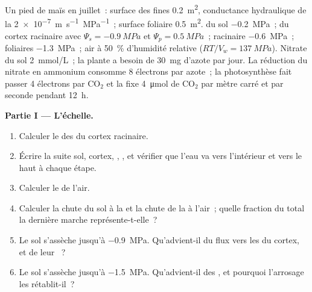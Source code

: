 \begin{problem}
\label{pb:b1:plant-water-minerals:1}
Un pied de maïs en juillet~: surface des  fines \qty{0.2}{m^2},
conductance hydraulique de la 
\qty{2e-7}{m.s^{-1}.MPa^{-1}}~; surface foliaire \qty{0.5}{m^2}.
 du sol \qty{-0.2}{MPa}~;  du cortex racinaire
avec $\Psi_s = \qty{-0.9}{MPa}$ et $\Psi_p = \qty{0.5}{MPa}$~; 
racinaire \qty{-0.6}{MPa}~;  foliaires \qty{-1.3}{MPa}~; air à
\qty{50}{\%} d'humidité relative ($RT/V_w = \qty{137}{MPa}$). Nitrate du
sol \qty{2}{mmol/L}~; la plante a besoin de \qty{30}{mg} d'azote par
jour. La réduction du nitrate en ammonium consomme 8 électrons par
azote~; la photosynthèse fait passer 4 électrons par $\mathrm{CO_2}$ et
la  fixe \qty{4}{\micro mol} de $\mathrm{CO_2}$ par mètre carré
et par seconde pendant \qty{12}{h}.

\medskip
\noindent\textbf{Partie I --- L'échelle.}
\begin{enumerate}
  \item Calculer le  des  du cortex racinaire.
  \item Écrire la suite sol, cortex, , , et vérifier que
        l'eau va vers l'intérieur et vers le haut à chaque étape.
  \item Calculer le  de l'air.
  \item Calculer la chute du sol à la  et la chute de la 
        à l'air~; quelle fraction du total la dernière marche
        représente-t-elle~?
  \item Le sol s'assèche jusqu'à \qty{-0.9}{MPa}. Qu'advient-il du flux
        vers les  du cortex, et de leur ~?
  \item Le sol s'assèche jusqu'à \qty{-1.5}{MPa}. Qu'advient-il des
        , et pourquoi l'arrosage les rétablit-il~?
\end{enumerate}


\end{problem}
